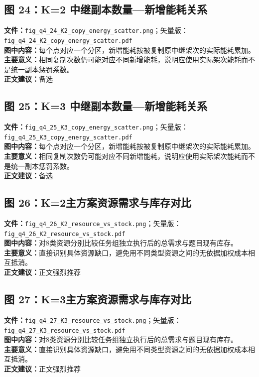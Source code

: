 \subsection*{图 24：K=2 中继副本数量—新增能耗关系}
\textbf{文件：}\texttt{fig\_q4\_24\_K2\_copy\_energy\_scatter.png}；矢量版：\texttt{fig\_q4\_24\_K2\_copy\_energy\_scatter.pdf}\\
\textbf{图中内容：}每个点对应一个分区，新增能耗按被复制原中继架次的实际能耗累加。\\
\textbf{主要意义：}相同复制次数仍可能对应不同新增能耗，说明应使用实际架次能耗而不是统一副本惩罚系数。\\
\textbf{正文建议：}备选

\subsection*{图 25：K=3 中继副本数量—新增能耗关系}
\textbf{文件：}\texttt{fig\_q4\_25\_K3\_copy\_energy\_scatter.png}；矢量版：\texttt{fig\_q4\_25\_K3\_copy\_energy\_scatter.pdf}\\
\textbf{图中内容：}每个点对应一个分区，新增能耗按被复制原中继架次的实际能耗累加。\\
\textbf{主要意义：}相同复制次数仍可能对应不同新增能耗，说明应使用实际架次能耗而不是统一副本惩罚系数。\\
\textbf{正文建议：}备选

\subsection*{图 26：K=2主方案资源需求与库存对比}
\textbf{文件：}\texttt{fig\_q4\_26\_K2\_resource\_vs\_stock.png}；矢量版：\texttt{fig\_q4\_26\_K2\_resource\_vs\_stock.pdf}\\
\textbf{图中内容：}对8类资源分别比较任务组独立执行后的总需求与题目现有库存。\\
\textbf{主要意义：}直接识别具体资源缺口，避免用不同类型资源之间的无依据加权成本相互抵消。\\
\textbf{正文建议：}正文强烈推荐

\subsection*{图 27：K=3主方案资源需求与库存对比}
\textbf{文件：}\texttt{fig\_q4\_27\_K3\_resource\_vs\_stock.png}；矢量版：\texttt{fig\_q4\_27\_K3\_resource\_vs\_stock.pdf}\\
\textbf{图中内容：}对8类资源分别比较任务组独立执行后的总需求与题目现有库存。\\
\textbf{主要意义：}直接识别具体资源缺口，避免用不同类型资源之间的无依据加权成本相互抵消。\\
\textbf{正文建议：}正文强烈推荐

